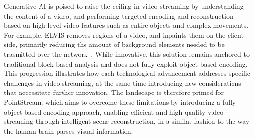 \documentclass[sigconf, screen, review, anonymous]{acmart}
\begin{document}
Generative AI is poised to raise the ceiling in video streaming by understanding the content of a video, and performing targeted encoding and reconstruction based on high-level video features such as entire objects and complex movements. For example, ELVIS removes regions of a video, and inpaints them on the client side, primarily reducing the amount of background elements needed to be trasmitted over the network~\cite{elvis}. While innovative, this solution remains anchored to traditional block-based analysis and does not fully exploit object-based encoding.
This progression illustrates how each technological advancement addresses specific challenges in video streaming, at the same time introducing new considerations that necessitate further innovation. The landscape is therefore primed for PointStream, which aims to overcome these limitations by introducing a fully object-based encoding approach, enabling efficient and high-quality video streaming through intelligent scene reconstruction, in a similar fashion to the way the human brain parses visual information.


\end{document}
